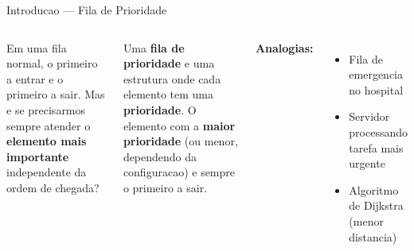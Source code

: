\documentclass[aspectratio=169,11pt]{beamer}
\begin{document}
\begin{frame}{Introducao --- Fila de Prioridade}
  \begin{columns}[c]
      \begin{tcolorbox}[caixaRoxa,title={Problema com Queue simples}]
        \small
        Em uma fila normal, o primeiro a entrar e o
        primeiro a sair. Mas e se precisarmos sempre
        atender o \textbf{elemento mais importante}
        independente da ordem de chegada?
      \end{tcolorbox}
      \vspace{0.2cm}
      \begin{tcolorbox}[caixaAzul,title={Solucao: Priority Queue}]
        \small
        Uma \textbf{fila de prioridade} e uma estrutura
        onde cada elemento tem uma \textbf{prioridade}.
        O elemento com a \textbf{maior prioridade}
        (ou menor, dependendo da configuracao)
        e sempre o primeiro a sair.
      \end{tcolorbox}
      \vspace{0.2cm}
      \textbf{Analogias:}
      \begin{itemize}\small
        \item Fila de emergencia no hospital
        \item Servidor processando tarefa mais urgente
        \item Algoritmo de Dijkstra (menor distancia)
      \end{itemize}
      \centering
\end{columns}
\end{frame}
\end{document}
